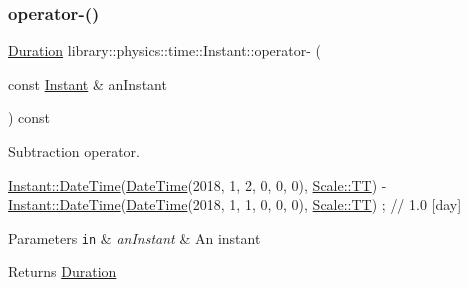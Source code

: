 \subsubsection{\texorpdfstring{operator-\/()}{operator-()}\hspace{0.1cm}{\footnotesize\ttfamily [2/2]}}
{\footnotesize\ttfamily \hyperlink{classlibrary_1_1physics_1_1time_1_1_duration}{Duration} library\+::physics\+::time\+::\+Instant\+::operator-\/ (\begin{DoxyParamCaption}\item[{const \hyperlink{classlibrary_1_1physics_1_1time_1_1_instant}{Instant} \&}]{an\+Instant }\end{DoxyParamCaption}) const}



Subtraction operator. 


\begin{DoxyCode}
\hyperlink{classlibrary_1_1physics_1_1time_1_1_instant_ac827b6ffa57ce75a3c56c462d4c872f8}{Instant::DateTime}(\hyperlink{classlibrary_1_1physics_1_1time_1_1_instant_ac827b6ffa57ce75a3c56c462d4c872f8}{DateTime}(2018, 1, 2, 0, 0, 0), 
      \hyperlink{namespacelibrary_1_1physics_1_1time_a09d2bc9fbc7b0b5f92e1419bd655e6bbadf1f3edb9115acb0a1e04209b7a9937b}{Scale::TT}) - \hyperlink{classlibrary_1_1physics_1_1time_1_1_instant_ac827b6ffa57ce75a3c56c462d4c872f8}{Instant::DateTime}(\hyperlink{classlibrary_1_1physics_1_1time_1_1_instant_ac827b6ffa57ce75a3c56c462d4c872f8}{DateTime}(2018, 1, 1, 0, 0, 0), 
      \hyperlink{namespacelibrary_1_1physics_1_1time_a09d2bc9fbc7b0b5f92e1419bd655e6bbadf1f3edb9115acb0a1e04209b7a9937b}{Scale::TT}) ; \textcolor{comment}{// 1.0 [day]}
\end{DoxyCode}



\begin{DoxyParams}[1]{Parameters}
\mbox{\tt in}  & {\em an\+Instant} & An instant \\
\hline
\end{DoxyParams}
\begin{DoxyReturn}{Returns}
\hyperlink{classlibrary_1_1physics_1_1time_1_1_duration}{Duration} 
\end{DoxyReturn}
\mbox{\label{classlibrary_1_1physics_1_1time_1_1_instant_a629531fc4507a3ef0375f88696fed34e}} 
